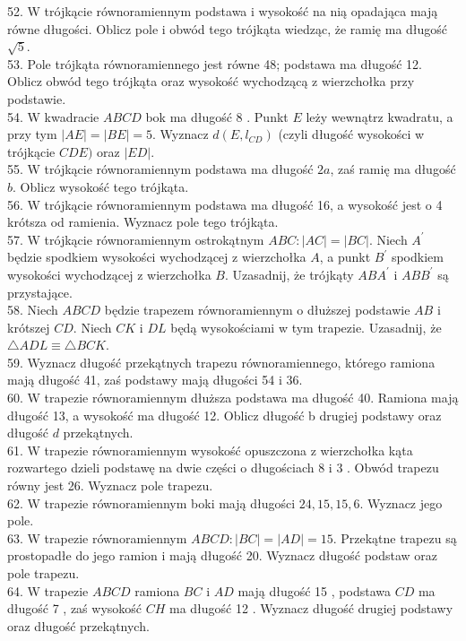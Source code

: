 \documentclass[10pt]{article}
\begin{document}
52. W trójkącie równoramiennym podstawa i wysokość na nią opadająca mają równe długości. Oblicz pole i obwód tego trójkąta wiedząc, że ramię ma długość \(\sqrt{5}\).\\
53. Pole trójkąta równoramiennego jest równe 48; podstawa ma długość 12. Oblicz obwód tego trójkąta oraz wysokość wychodzącą z wierzchołka przy podstawie.\\
54. W kwadracie \(A B C D\) bok ma długość 8 . Punkt \(E\) leży wewnątrz kwadratu, a przy tym \(|A E|=|B E|=5\). Wyznacz \(d\left(E, l_{C D}\right)\) (czyli długość wysokości w trójkącie \(C D E)\) oraz \(|E D|\).\\
55. W trójkącie równoramiennym podstawa ma długość \(2 a\), zaś ramię ma długość \(b\). Oblicz wysokość tego trójkąta.\\
56. W trójkącie równoramiennym podstawa ma długość 16, a wysokość jest o 4 krótsza od ramienia. Wyznacz pole tego trójkąta.\\
57. W trójkącie równoramiennym ostrokątnym \(A B C:|A C|=|B C|\). Niech \(A^{\prime}\) będzie spodkiem wysokości wychodzącej z wierzchołka \(A\), a punkt \(B^{\prime}\) spodkiem wysokości wychodzącej z wierzchołka \(B\). Uzasadnij, że trójkąty \(A B A^{\prime}\) i \(A B B^{\prime}\) są przystające.\\
58. Niech \(A B C D\) będzie trapezem równoramiennym o dłuższej podstawie \(A B\) i krótszej \(C D\). Niech \(C K\) i \(D L\) będą wysokościami w tym trapezie. Uzasadnij, że \(\triangle A D L \equiv \triangle B C K\).\\
59. Wyznacz długość przekątnych trapezu równoramiennego, którego ramiona mają długość 41, zaś podstawy mają długości 54 i 36.\\
60. W trapezie równoramiennym dłuższa podstawa ma długość 40. Ramiona mają długość 13, a wysokość ma długość 12. Oblicz długość b drugiej podstawy oraz długość \(d\) przekątnych.\\
61. W trapezie równoramiennym wysokość opuszczona z wierzchołka kąta rozwartego dzieli podstawę na dwie części o długościach 8 i 3 . Obwód trapezu równy jest 26. Wyznacz pole trapezu.\\
62. W trapezie równoramiennym boki mają długości \(24,15,15,6\). Wyznacz jego pole.\\
63. W trapezie równoramiennym \(A B C D:|B C|=|A D|=15\). Przekątne trapezu są prostopadłe do jego ramion i mają długość 20. Wyznacz długość podstaw oraz pole trapezu.\\
64. W trapezie \(A B C D\) ramiona \(B C\) i \(A D\) mają długość 15 , podstawa \(C D\) ma długość 7 , zaś wysokość \(C H\) ma długość 12 . Wyznacz długość drugiej podstawy oraz długość przekątnych.
\end{document}
